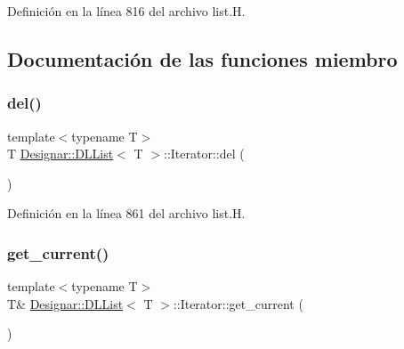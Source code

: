 Definición en la línea 816 del archivo list.\+H.



\subsection{Documentación de las funciones miembro}
\mbox{\label{class_designar_1_1_d_l_list_1_1_iterator_a98644b925b49ea22a9552039abb2624d}} 
\subsubsection{\texorpdfstring{del()}{del()}}
{\footnotesize\ttfamily template$<$typename T$>$ \\
T \hyperlink{class_designar_1_1_d_l_list}{Designar\+::\+D\+L\+List}$<$ T $>$\+::Iterator\+::del (\begin{DoxyParamCaption}{ }\end{DoxyParamCaption})\hspace{0.3cm}{\ttfamily [inline]}}



Definición en la línea 861 del archivo list.\+H.

\mbox{\label{class_designar_1_1_d_l_list_1_1_iterator_ad724b6e244dcd79d58b5772083e853ef}} 
\subsubsection{\texorpdfstring{get\+\_\+current()}{get\_current()}\hspace{0.1cm}{\footnotesize\ttfamily [1/2]}}
{\footnotesize\ttfamily template$<$typename T$>$ \\
T\& \hyperlink{class_designar_1_1_d_l_list}{Designar\+::\+D\+L\+List}$<$ T $>$\+::Iterator\+::get\+\_\+current (\begin{DoxyParamCaption}{ }\end{DoxyParamCaption})\hspace{0.3cm}{\ttfamily [inline]}}



